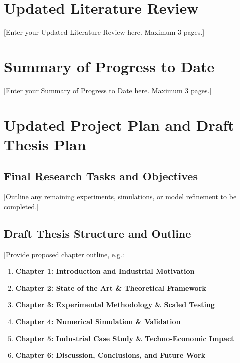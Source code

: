 \documentclass[year3]{../idcore-ar}
\author{Jane Doe}
\begin{document}
\makecoverpage

\section{Updated Literature Review}

[Enter your Updated Literature Review here. Maximum 3 pages.]


\section{Summary of Progress to Date}

[Enter your Summary of Progress to Date here. Maximum 3 pages.]


\section{Updated Project Plan and Draft Thesis Plan}

\subsection{Final Research Tasks and Objectives}
[Outline any remaining experiments, simulations, or model refinement to be completed.]

\subsection{Draft Thesis Structure and Outline}
[Provide proposed chapter outline, e.g.:]
\begin{enumerate}\setlength{\itemsep}{1pt}
  \item \textbf{Chapter 1: Introduction and Industrial Motivation}
  \item \textbf{Chapter 2: State of the Art \& Theoretical Framework}
  \item \textbf{Chapter 3: Experimental Methodology \& Scaled Testing}
  \item \textbf{Chapter 4: Numerical Simulation \& Validation}
  \item \textbf{Chapter 5: Industrial Case Study \& Techno-Economic Impact}
  \item \textbf{Chapter 6: Discussion, Conclusions, and Future Work}
\end{enumerate}
\end{document}
